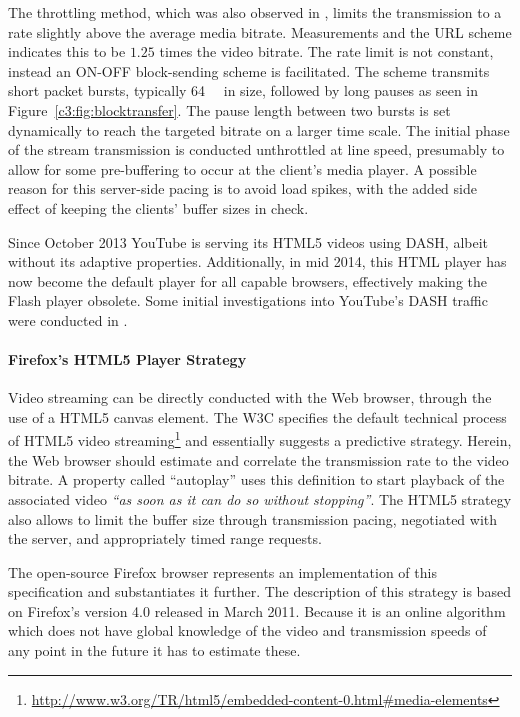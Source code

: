 The throttling method, which was also observed in \cite{alcock2011afcyt}, limits the transmission to a rate slightly above the average media bitrate. Measurements and the \gls{URL} scheme indicates this to be $1.25$ times the video bitrate. The rate limit is not constant, instead an ON-OFF block-sending scheme is facilitated. The scheme transmits short packet bursts, typically \SI{64}{\kibi\byte} in size, followed by long pauses as seen in Figure~\ref{c3:fig:blocktransfer}. The pause length between two bursts is set dynamically to reach the targeted bitrate on a larger time scale. The initial phase of the stream transmission is conducted unthrottled at line speed, presumably to allow for some pre-buffering to occur at the client's media player. A possible reason for this server-side pacing is to avoid load spikes, with the added side effect of keeping the clients' buffer sizes in check.

Since October 2013 YouTube is serving its \acrshort{HTML}5 videos using \gls{DASH}, albeit without its adaptive properties. Additionally, in mid 2014, this \acrshort{HTML} player has now become the default player for all capable browsers, effectively making the Flash player obsolete. Some initial investigations into YouTube's \gls{DASH} traffic were conducted in \cite{2014arXiv1408.5777A}.


\paragraph{Firefox's HTML5 Player Strategy}

Video streaming can be directly conducted with the Web browser, through the use of a \acrshort{HTML}5 canvas element. The \gls{W3C} specifies the default technical process of \acrshort{HTML}5 video streaming\footnote{\url{http://www.w3.org/TR/html5/embedded-content-0.html\#media-elements}} and essentially suggests a predictive strategy. Herein, the Web browser should estimate and correlate the transmission rate to the video bitrate. A property called ``autoplay'' uses this definition to start playback of the associated video \textit{\enquote{as soon as it can do so without stopping}}. The \acrshort{HTML}5 strategy also allows to limit the buffer size through transmission pacing, negotiated with the server, and appropriately timed range requests.

The open-source Firefox browser represents an implementation of this specification and substantiates it further. The description of this strategy is based on Firefox's version 4.0 released in March 2011. Because it is an online algorithm which does not have global knowledge of the video and transmission speeds of any point in the future it has to estimate these.

